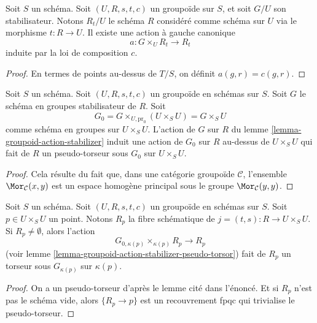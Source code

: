 \begin{lemma}
\label{lemma-groupoid-action-stabilizer}
Soit $S$ un schéma.
Soit $(U, R, s, t, c)$ un groupoïde sur $S$, et soit $G/U$ son stabilisateur.
Notons $R_t/U$ le schéma $R$ considéré comme schéma sur $U$ via le
morphisme $t : R \to U$.
Il existe une action à gauche canonique
$$
a : G \times_U R_t \longrightarrow R_t
$$
induite par la loi de composition $c$.
\end{lemma}

\begin{proof}
En termes de points au-dessus de $T/S$, on définit $a(g, r) = c(g, r)$.
\end{proof}

\begin{lemma}
\label{lemma-groupoid-action-stabilizer-pseudo-torsor}
Soit $S$ un schéma. Soit $(U, R, s, t, c)$ un groupoïde en schémas
sur $S$. Soit $G$ le schéma en groupes stabilisateur de $R$.
Soit
$$
G_0 = G \times_{U, \text{pr}_0} (U \times_S U) = G \times_S U
$$
comme schéma en groupes sur $U \times_S U$. L'action de $G$ sur $R$ du
lemme \ref{lemma-groupoid-action-stabilizer}
induit une action de $G_0$ sur $R$ au-dessus de $U \times_S U$
qui fait de $R$ un pseudo-torseur sous $G_0$ sur $U \times_S U$.
\end{lemma}

\begin{proof}
Cela résulte du fait que, dans une catégorie groupoïde $\mathcal{C}$, l'ensemble
$\Mor_\mathcal{C}(x, y)$ est un espace homogène principal
sous le groupe $\Mor_\mathcal{C}(y, y)$.
\end{proof}

\begin{lemma}
\label{lemma-fibres-j}
Soit $S$ un schéma. Soit $(U, R, s, t, c)$ un groupoïde en schémas sur $S$.
Soit $p \in U \times_S U$ un point. Notons
$R_p$ la fibre schématique de $j = (t, s) : R \to U \times_S U$.
Si $R_p \not = \emptyset$, alors l'action
$$
G_{0, \kappa(p)} \times_{\kappa(p)} R_p \longrightarrow R_p
$$
(voir
lemme \ref{lemma-groupoid-action-stabilizer-pseudo-torsor})
fait de $R_p$ un torseur sous $G_{\kappa(p)}$ sur $\kappa(p)$.
\end{lemma}

\begin{proof}
On a un pseudo-torseur d'après le lemme cité dans l'énoncé.
Et si $R_p$ n'est pas le schéma vide, alors $\{R_p \to p\}$
est un recouvrement fpqc qui trivialise le pseudo-torseur.
\end{proof}







